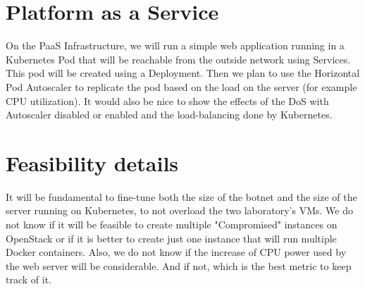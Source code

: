 \documentclass{article}
\begin{document}
\section{Platform as a Service}
\label{pass}
On the PaaS Infrastructure, we will run a simple web application running in a Kubernetes Pod that will be reachable from the outside network using Services. This pod will be created using a Deployment.  Then we plan to use the Horizontal Pod Autoscaler to replicate the pod based on the load on the server (for example CPU utilization). It would also be nice to show the effects of the DoS with Autoscaler disabled or enabled and the load-balancing done by Kubernetes.

\section{Feasibility details}
\label{feasibility}

It will be fundamental to fine-tune both the size of the botnet and the size of the server running on Kubernetes, to not overload the two laboratory's VMs. We do not know if it will be feasible to create multiple "Compromised" instances on OpenStack or if it is better to create just one instance that will run multiple Docker containers. Also, we do not know if the increase of CPU power used by the web server will be considerable. And if not, which is the best metric to keep track of it.
\end{document}
